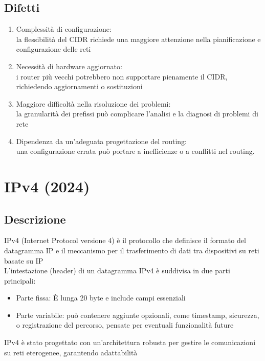 \documentclass[10pt,oneside,a4paper]{article}
\begin{document}
\subsection{Difetti}
\begin{enumerate}
\item Complessità di configurazione:\\
la flessibilità del CIDR richiede una maggiore attenzione nella pianificazione e configurazione delle reti
\item Necessità di hardware aggiornato:\\
i router più vecchi potrebbero non supportare pienamente il CIDR, richiedendo aggiornamenti o sostituzioni
\item Maggiore difficoltà nella risoluzione dei problemi:\\
la granularità dei prefissi può complicare l'analisi e la diagnosi di problemi di rete
\item Dipendenza da un'adeguata progettazione del routing:\\
una configurazione errata può portare a inefficienze o a conflitti nel routing.
\end{enumerate}
\section{IPv4 (2024)}
\subsection{Descrizione}
IPv4 (Internet Protocol versione 4) è il protocollo che definisce il formato del datagramma IP e il meccanismo per il trasferimento di dati tra dispositivi su reti basate su IP\\
L'intestazione (header) di un datagramma IPv4 è suddivisa in due parti principali:
\begin{itemize}
\item Parte fissa: È lunga 20 byte e include campi essenziali
\item Parte variabile: può contenere aggiunte opzionali, come timestamp, sicurezza, o registrazione del percorso, pensate per eventuali funzionalità future
\end{itemize}
IPv4 è stato progettato con un'architettura robusta per gestire le comunicazioni su reti eterogenee, garantendo adattabilità
\end{document}
